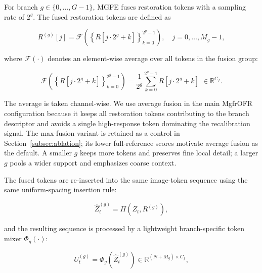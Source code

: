 For branch $g \in \{0,\ldots,G-1\}$, MGFE fuses restoration tokens with a sampling rate of $2^g$. The fused restoration tokens are defined as

\begin{equation}
R^{(g)}[j] =
\mathcal{F}\!\left(
\left\{R[j{\cdot}2^g+k]\right\}_{k=0}^{2^g-1}
\right),\quad
j = 0,\ldots,M_g-1,
\end{equation}

where $\mathcal{F}(\cdot)$ denotes an element-wise average over all tokens in the fusion group:

\begin{equation}
\mathcal{F}\!\left(
\left\{R[j\cdot2^g+k]\right\}_{k=0}^{2^g-1}
\right)
= \frac{1}{2^g}\sum_{k=0}^{2^g-1} R[j\cdot2^g+k]\;\in\mathbb{R}^{C_f}.
\label{eq:avg_fusion}
\end{equation}

The average is taken channel-wise. We use average fusion in the main MgfrOFR configuration because it keeps all restoration tokens contributing to the branch descriptor and avoids a single high-response token dominating the recalibration signal. The max-fusion variant is retained as a control in Section~\ref{subsec:ablation}; its lower full-reference scores motivate average fusion as the default. A smaller $g$ keeps more tokens and preserves fine local detail; a larger $g$ pools a wider support and emphasizes coarse context.

The fused tokens are re-inserted into the same image-token sequence using the same uniform-spacing insertion rule:

\begin{equation}
\widehat{Z}_t^{(g)} = \Pi\!\left(Z_t,R^{(g)}\right),
\end{equation}

and the resulting sequence is processed by a lightweight branch-specific token mixer $\Phi_g(\cdot)$:

\begin{equation}
U_t^{(g)} = \Phi_g\!\left(\widehat{Z}_t^{(g)}\right)
\in \mathbb{R}^{(N+M_g)\times C_f},
\end{equation}

